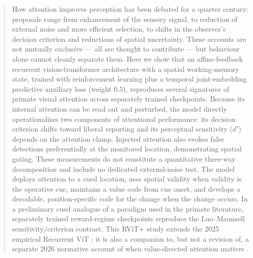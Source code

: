 \begin{abstract}
\noindent How attention improves perception has been debated for a quarter century:
proposals range from enhancement of the sensory signal, to reduction of external
noise and more efficient selection, to shifts in the observer's decision criterion
and reductions of spatial uncertainty. These accounts are not mutually exclusive ---
all are thought to contribute --- but behaviour alone cannot cleanly separate them.
Here we show that an affine-feedback recurrent vision-transformer architecture with a spatial
working-memory state, trained with reinforcement learning plus a temporal joint-embedding
predictive auxiliary loss (weight $0.5$), reproduces several signatures of primate visual attention across
separately trained checkpoints. Because its internal attention can be read out and perturbed,
the model directly operationalizes two components of attentional performance: its decision
criterion shifts toward liberal reporting and its perceptual sensitivity ($d'$) depends on
the attention clamp. Injected attention also evokes false detections preferentially at the
monitored location, demonstrating spatial gating. These measurements do not constitute a
quantitative three-way decomposition and include no dedicated external-noise test. The model
deploys attention to a cued location, uses spatial validity when validity is the operative cue,
maintains a value code from cue onset, and develops a decodable, position-specific code for the
change when the change occurs. In a preliminary cued analogue of a paradigm used in the primate
literature, separately trained reward-regime checkpoints reproduce the Luo--Maunsell
sensitivity/criterion contrast. This RViT+ study extends the 2025 empirical Recurrent ViT
\cite{morgan_albanna_herman2025_rvit}; it is also a companion to, but not a revision
of, a separate 2026 normative account of when value-directed attention matters
\cite{morgan_albanna_herman2026_vda}.
\end{abstract}
